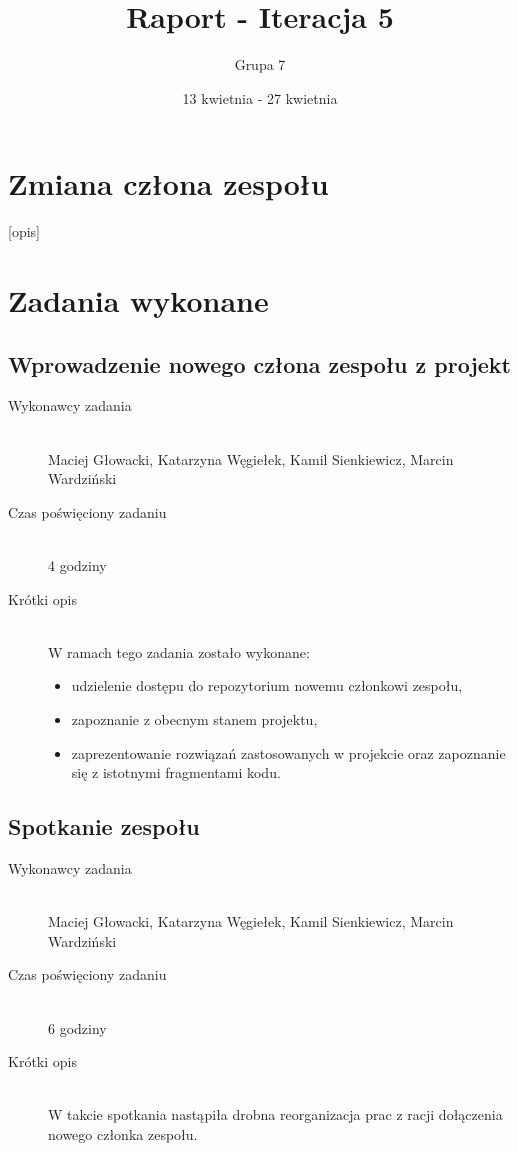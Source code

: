 \documentclass[a4paper]{article}
\title{Raport - Iteracja 5}
\date{13 kwietnia - 27 kwietnia}
\author{Grupa 7}
\begin{document}
\maketitle

\section{Zmiana człona zespołu}
[opis]

\section{Zadania wykonane}
\subsection{Wprowadzenie nowego człona zespołu z projekt}
\begin{description}
    \item[Wykonawcy zadania] \hfill \\ Maciej Głowacki, Katarzyna Węgiełek, Kamil Sienkiewicz, Marcin Wardziński
    \item[Czas poświęciony zadaniu] \hfill \\ 4 godziny
    \item[Krótki opis] \hfill \\ W ramach tego zadania zostało wykonane:
    \begin{itemize}
    	\item udzielenie dostępu do repozytorium nowemu członkowi zespołu,
    	\item zapoznanie z obecnym stanem projektu,
    	\item zaprezentowanie rozwiązań zastosowanych w projekcie oraz zapoznanie się z istotnymi fragmentami kodu. 
    \end{itemize}
\end{description}

\subsection{Spotkanie zespołu}
\begin{description}
    \item[Wykonawcy zadania] \hfill \\ Maciej Głowacki, Katarzyna Węgiełek, Kamil Sienkiewicz, Marcin Wardziński
    \item[Czas poświęciony zadaniu] \hfill \\ 6 godziny
    \item[Krótki opis] \hfill \\ W takcie spotkania nastąpiła drobna reorganizacja prac z racji dołączenia nowego członka zespołu.
\end{description}
\end{document}
